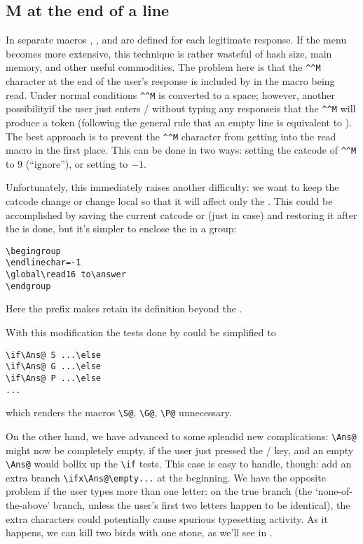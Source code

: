 {\subsection{{M} at the end of a line}
In \label{s:endlinechar}
 separate macros , , and
 are defined for each legitimate response. If the menu
becomes more extensive, this technique is rather wasteful
of hash size, main memory, and other useful commodities.
The problem here is that the
\verb|^^M| character at the end of the user's response
is included by  in the macro being read.
Under normal conditions
\verb|^^M| is converted to a space; however, another
possibility\Dash if the user just enters \return/ without
typing any response\Dash is that the \verb|^^M| will produce a 
token (following the general rule that an empty line is
equivalent to ). The best approach is
to prevent the \verb|^^M| character from getting into the
read macro in the first place.  This can be done in two ways:
setting the catcode of \verb|^^M| to 9 (``ignore''), or
setting  to $-1$.

Unfortunately, this immediately raises another difficulty: we want to keep
the catcode change or  change local so that it will
affect only the . This could be accomplished by
saving the current catcode or  (just in case)
and restoring it after the  is done, but it's
simpler to enclose the  in a group:
\begin{verbatim}
\begingroup
\endlinechar=-1
\global\read16 to\answer
\endgroup
\end{verbatim}
Here the  prefix makes 
retain its definition beyond the .

With this modification the tests done by  could be
simplified to
\begin{verbatim}
\if\Ans@ S ...\else
\if\Ans@ G ...\else
\if\Ans@ P ...\else
...
\end{verbatim}
which renders the macros \verb|\S@|, \verb|\G@|, \verb|\P@| unnecessary.

On the other hand, we have advanced to some splendid new
complications: \verb|\Ans@| might now be completely empty, if the
user just pressed the \return/ key, and an empty \verb|\Ans@| would
bollix up the \verb|\if| tests. This case is easy to handle, though:
add an extra branch \verb|\ifx\Ans@\empty...| at the beginning.
We have the opposite problem if the user types more than one
letter: on the true branch (the `none-of-the-above' branch, unless
the user's first two letters happen to be identical), the extra
characters could potentially cause spurious typesetting activity. As
it happens, we can kill two birds with one stone, as we'll see
in .

}
